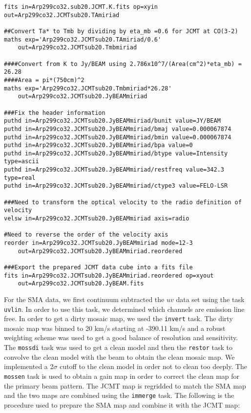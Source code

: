 \begin{verbatim}
fits in=Arp299co32.sub20.JCMT.K.fits op=xyin out=Arp299co32.JCMTsub20.TAmiriad

##Convert Ta* to Tmb by dividing by eta_mb =0.6 for JCMT at CO(3-2)
maths exp='Arp299co32.JCMTsub20.TAmiriad/0.6' 
	out=Arp299co32.JCMTsub20.Tmbmiriad

####Convert from K to Jy/BEAM using 2.786x10^7/(Area(cm^2)*eta_mb) = 26.28 
####Area = pi*(750cm)^2
maths exp='Arp299co32.JCMTsub20.Tmbmiriad*26.28' 
	out=Arp299co32.JCMTsub20.JyBEAMmiriad

###Fix the header information 
puthd in=Arp299co32.JCMTsub20.JyBEAMmiriad/bunit value=JY/BEAM
puthd in=Arp299co32.JCMTsub20.JyBEAMmiriad/bmaj value=0.000067874
puthd in=Arp299co32.JCMTsub20.JyBEAMmiriad/bmin value=0.000067874
puthd in=Arp299co32.JCMTsub20.JyBEAMmiriad/bpa value=0
puthd in=Arp299co32.JCMTsub20.JyBEAMmiriad/btype value=Intensity type=ascii
puthd in=Arp299co32.JCMTsub20.JyBEAMmiriad/restfreq value=342.3 type=real
puthd in=Arp299co32.JCMTsub20.JyBEAMmiriad/ctype3 value=FELO-LSR

###Need to transform the optical velocity to the radio definition of velocity
velsw in=Arp299co32.JCMTsub20.JyBEAMmiriad axis=radio

#Need to reverse the order of the velocity axis 
reorder in=Arp299co32.JCMTsub20.JyBEAMmiriad mode=12-3 
	out=Arp299co32.JCMTsub20.JyBEAMmiriad.reordered

###Export the prepared JCMT data cube into a fits file
fits in=Arp299co32.JCMTsub20.JyBEAMmiriad.reordered op=xyout 
	out=Arp299co32.JCMTsub20.JyBEAM.fits
\end{verbatim}

For the SMA data, we first continuum subtracted the $uv$ data set using the task \verb=uvlin=. In order to use this task, we determined which channels are emission line free. In order to get a dirty mosaic map, we used the \verb=invert= task. The dirty mosaic map was binned to 20 km/s starting at -390.11 km/s and a robust weighting scheme was used to get a good balance of resolution and sensitivity. The \verb=mossdi= task was used to get a clean model and then the \verb=restor= task to convolve the clean model with the beam to obtain the clean mosaic map. We implemented a 2$\sigma$ cutoff to the clean model in order not to clean too deeply. The \verb=mossen= task is used to obtain a gain map in order to correct the clean map for the primary beam pattern. The JCMT map is regridded to match the SMA map and the two maps are combined using the \verb=immerge= task. The following is the procedure used to prepare the SMA map and combine it with the JCMT map:

